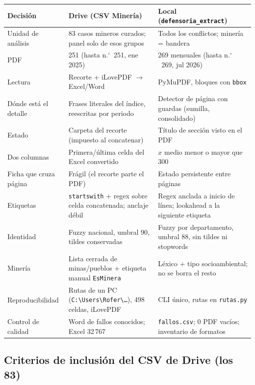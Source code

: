 \documentclass[11pt,a4paper]{article}
\begin{document}
\begin{center}
\renewcommand{\arraystretch}{1.22}
\begin{tabularx}{\textwidth}{@{}l Y Y@{}}
\toprule
\textbf{Decisión} & \textbf{Drive (CSV Minería)} & \textbf{Local (\texttt{defensoria\_extract})} \\
\midrule
Unidad de análisis & 83 casos mineros curados; panel solo de esos grupos & Todos los conflictos; minería = bandera \\
PDF & 251 (hasta n.$^\circ$~251, ene 2025) & 269 mensuales (hasta n.$^\circ$~269, jul 2026) \\
Lectura & Recorte + iLovePDF $\to$ Excel/Word & PyMuPDF, bloques con \texttt{bbox} \\
Dónde está el detalle & Frases literales del índice, reescritas por periodo & Detector de página con guardas (sumilla, consolidado) \\
Estado & Carpeta del recorte (impuesto al concatenar) & Título de sección visto en el PDF \\
Dos columnas & Primera/última celda del Excel convertido & $x$ medio menor o mayor que 300 \\
Ficha que cruza página & Frágil (el recorte parte el PDF) & Estado persistente entre páginas \\
Etiquetas & \texttt{startswith} + regex sobre celda concatenada; anclaje débil & Regex anclada a inicio de línea; lookahead a la siguiente etiqueta \\
Identidad & Fuzzy nacional, umbral 90, tildes conservadas & Fuzzy por departamento, umbral 88, sin tildes ni stopwords \\
Minería & Lista cerrada de minas/pueblos + etiqueta manual \texttt{EsMinera} & Léxico + tipo socioambiental; no se borra el resto \\
Reproducibilidad & Rutas de un PC (\texttt{C:\textbackslash Users\textbackslash Rofer\textbackslash \ldots}), 498 celdas, iLovePDF & CLI único, rutas en \texttt{rutas.py} \\
Control de calidad & Word de fallos conocidos; Excel 32\,767 & \texttt{fallos.csv}; 0 PDF vacíos; inventario de formatos \\
\bottomrule
\end{tabularx}
\end{center}

\subsection{Criterios de inclusión del CSV de Drive (los 83)}
\end{document}
